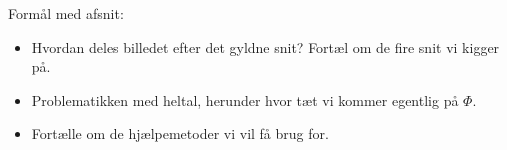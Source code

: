 {
Formål med afsnit:
\begin{itemize}
	\item Hvordan deles billedet efter det gyldne snit? Fortæl om de
		fire snit vi kigger på.
	\item Problematikken med heltal, herunder hvor tæt vi kommer
		egentlig på $\varPhi$.
	\item Fortælle om de hjælpemetoder vi vil få brug for.
\end{itemize}

}

